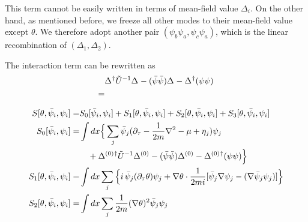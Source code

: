 This term cannot be easily written in terms of mean-field value $\Delta_i$.   On the other hand, as mentioned before, we freeze all  other modes to their mean-field value except $\theta$.  We therefore adopt another pair $({\psi_{b}\psi_{a}},{\psi_{c}\psi_{a}})$, which is the linear recombination of $(\Delta_{1},\Delta_{2})$.  

The interaction term can be rewritten as 
\begin{align*}
&\Delta^{}{}^{\dagger}\tilde{U}^{-1}\Delta^{}-(\bar\psi\bar\psi)\Delta^{}-{\Delta^{}}{}^{\dagger}(\psi\psi)\\
=&
\end{align*}

\begin{subequations}
\begin{align}
S[\theta,\bar\psi_{i},\psi_{i}]=&S_0[\bar\psi_{i},\psi_{i}]+S_1[\theta,\bar\psi_{i},\psi_{i}]+S_2[\theta,\bar\psi_{i},\psi_{i}]
	+S_3[\theta,\bar\psi_{i},\psi_{i}]\\
S_0[\bar\psi_{i},\psi_{i}]=&\int{dx}
\Big\{\sum_{j}\bar\psi_{j}(\partial_\tau-\frac{1}{2m}\nabla^{2}-\mu+\eta_{j})\psi_{j}\nonumber\\
&\quad+\Delta^{(0)}{}^{\dagger}\tilde{U}^{-1}\Delta^{(0)}-(\bar\psi\bar\psi)\Delta^{(0)}-{\Delta^{(0)}}{}^{\dagger}(\psi\psi)\Big\}\\
S_1[\theta,\bar\psi_{i},\psi_{i}]=&\int{dx}\sum_{j}\Big\{
   i\,\bar\psi_{j}(\partial_{\tau}\theta)\psi_{j}+\nabla\theta\cdot\frac{1}{2mi}[\bar\psi_{j}\nabla\psi_{j}-(\nabla\bar{\psi}_{j}\psi_{j})]\Big\}\\
S_2[\theta,\bar\psi_{i},\psi_{i}]=&\int{dx}\sum_{j}\frac{1}{2m}(\nabla\theta)^{2}\bar\psi_{j}\psi_{j}
\end{align}
\end{subequations}

\begin{subappendices}

\end{subappendices}






